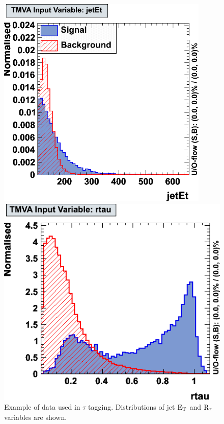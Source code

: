 \documentclass[a4paper]{jpconf}
\begin{document}
\begin{figure}[h]
 \begin{minipage}{7.8cm}
\includegraphics[width=0.9\textwidth]{images/jetet.png}
\end{minipage}
 \hfill
\begin{minipage}{7.8cm}
\includegraphics[width=1.0\textwidth]{images/rtau.png}
\end{minipage}

\caption{Example of data used in $\tau$ tagging.
Distributions of jet ${\rm E}_{\rm T}$ and ${\rm R}_{\tau}$  variables are shown.}
\label{fig:variables}
\end{figure}
\end{document}
